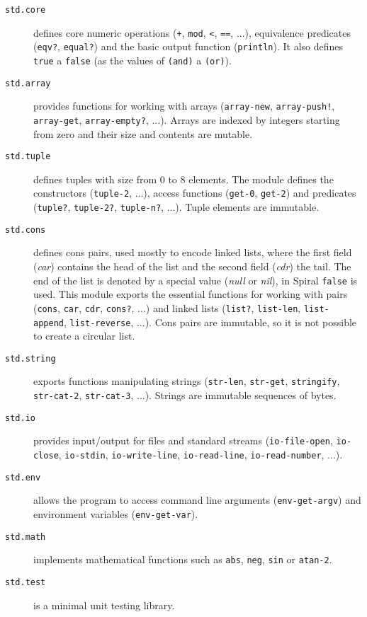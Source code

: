\begin{description}
  \item[\texttt{std.core}] defines core numeric operations (\texttt{+},
    \texttt{mod}, \texttt{<}, \texttt{==}, ...), equivalence predicates
    (\texttt{eqv?}, \texttt{equal?}) and the basic output function
    (\texttt{println}). It also defines \texttt{true} a \texttt{false} (as the
    values of \texttt{(and)} a \texttt{(or)}).

  \item[\texttt{std.array}] provides functions for working with arrays
    (\texttt{array-new}, \texttt{array-push!}, \texttt{array-get},
    \texttt{array-empty?}, ...). Arrays are indexed by integers starting from
    zero and their size and contents are mutable.

  \item[\texttt{std.tuple}] defines tuples with size from 0 to 8
    elements. The module defines the constructors (\texttt{tuple-2}, ...),
    access functions (\texttt{get-0}, \texttt{get-2}) and predicates
    (\texttt{tuple?}, \texttt{tuple-2?}, \texttt{tuple-n?}, ...). Tuple elements
    are immutable.

  \item[\texttt{std.cons}] defines cons pairs, used mostly to encode linked
    lists, where the first field (\emph{car}) contains the head of the list and
    the second field (\emph{cdr}) the tail. The end of the list is denoted by a
    special value (\emph{null} or \emph{nil}), in Spiral \texttt{false} is used.
    This module exports the essential functions for working with pairs
    (\texttt{cons}, \texttt{car}, \texttt{cdr}, \texttt{cons?}, ...) and linked
    lists (\texttt{list?}, \texttt{list-len}, \texttt{list-append},
    \texttt{list-reverse}, ...). Cons pairs are immutable, so it is not possible
    to create a circular list.

  \item[\texttt{std.string}] exports functions manipulating strings
    (\texttt{str-len}, \texttt{str-get}, \texttt{stringify}, \texttt{str-cat-2},
    \texttt{str-cat-3}, ...). Strings are immutable sequences of bytes.

  \item[\texttt{std.io}] provides input/output for files and standard streams
    (\texttt{io-file-open}, \texttt{io-close}, \texttt{io-stdin},
    \texttt{io-write-line}, \texttt{io-read-line}, \texttt{io-read-number},
    ...).

  \item[\texttt{std.env}] allows the program to access command line arguments
    (\texttt{env-get-argv}) and environment variables (\texttt{env-get-var}).

  \item[\texttt{std.math}] implements mathematical functions such as
    \texttt{abs}, \texttt{neg}, \texttt{sin} or \texttt{atan-2}.

  \item[\texttt{std.test}] is a minimal unit testing library.
\end{description}

